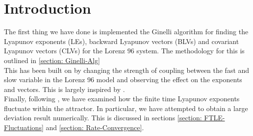 \section{Introduction}

The first thing we have done is implemented the Ginelli algorithm \cite{Ginelli2013} for finding the Lyapunov exponents (LEs), backward Lyapunov vectors (BLVs) and covariant Lyapunov vectors (CLVs) \cite{Kuptsov2012} for the Lorenz $96$ system. The methodology for this is outlined in \ref{section: Ginelli-Alg}\\

This has been built on by changing the strength of coupling between the fast and slow variable in the Lorenz $96$ model and observing the effect on the exponents and vectors. This is largely inspired by \cite{Carlu2019}. \\

Finally, following \cite{Politi2014}, we have examined how the finite time Lyapunov exponents fluctuate within the attractor. In particular, we have attempted to obtain a large deviation result numerically. This is discussed in sections \ref{section: FTLE-Fluctuations} and \ref{section: Rate-Convergence}.

